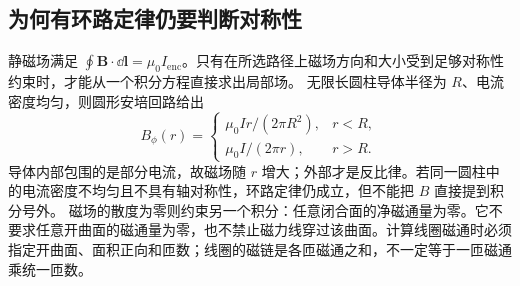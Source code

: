 \subsection{为何有环路定律仍要判断对称性}
静磁场满足 $\oint\boldsymbol B\cdot\dd\boldsymbol l=\mu_0I_{\mathrm{enc}}$。只有在所选路径上磁场方向和大小受到足够对称性约束时，才能从一个积分方程直接求出局部场。
无限长圆柱导体半径为 $R$、电流密度均匀，则圆形安培回路给出
\[
 B_\phi(r)=\begin{cases}\mu_0Ir/(2\pi R^2),&r<R,\\
 \mu_0I/(2\pi r),&r>R.
 \end{cases}
\]
导体内部包围的是部分电流，故磁场随 $r$ 增大；外部才是反比律。若同一圆柱中的电流密度不均匀且不具有轴对称性，环路定律仍成立，但不能把 $B$ 直接提到积分号外。
磁场的散度为零则约束另一个积分：任意闭合面的净磁通量为零。它不要求任意开曲面的磁通量为零，也不禁止磁力线穿过该曲面。计算线圈磁通时必须指定开曲面、面积正向和匝数；线圈的磁链是各匝磁通之和，不一定等于一匝磁通乘统一匝数。

